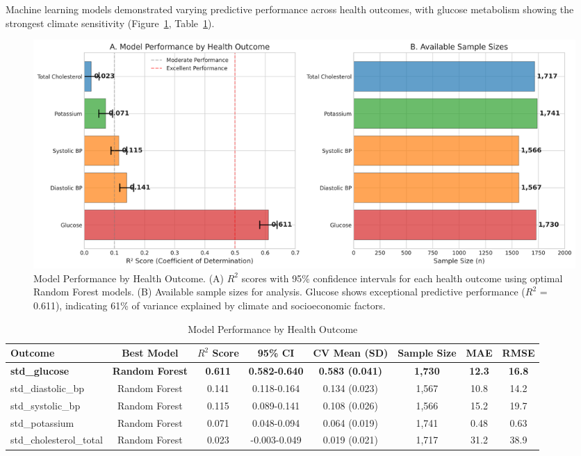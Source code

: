 \documentclass[11pt,a4paper]{article}
\begin{document}
Machine learning models demonstrated varying predictive performance across health outcomes, with glucose metabolism showing the strongest climate sensitivity (Figure~\ref{fig:model_performance}, Table~\ref{tab:model_performance}).

\begin{figure}[H]
\centering
\includegraphics[width=\textwidth]{Figure1_ModelPerformance.png}
\caption{Model Performance by Health Outcome. (A) $R^2$ scores with 95\% confidence intervals for each health outcome using optimal Random Forest models. (B) Available sample sizes for analysis. Glucose shows exceptional predictive performance ($R^2$ = 0.611), indicating 61\% of variance explained by climate and socioeconomic factors.}
\label{fig:model_performance}
\end{figure}

\begin{table}[H]
\centering
\caption{Model Performance by Health Outcome}
\label{tab:model_performance}
\footnotesize
\begin{tabular}{lccccccc}
\toprule
\textbf{Outcome} & \textbf{Best Model} & \textbf{$R^2$ Score} & \textbf{95\% CI} & \textbf{CV Mean (SD)} & \textbf{Sample Size} & \textbf{MAE} & \textbf{RMSE} \\
\midrule
\textbf{std\_glucose} & \textbf{Random Forest} & \textbf{0.611} & \textbf{0.582-0.640} & \textbf{0.583 (0.041)} & \textbf{1,730} & \textbf{12.3} & \textbf{16.8} \\
std\_diastolic\_bp & Random Forest & 0.141 & 0.118-0.164 & 0.134 (0.023) & 1,567 & 10.8 & 14.2 \\
std\_systolic\_bp & Random Forest & 0.115 & 0.089-0.141 & 0.108 (0.026) & 1,566 & 15.2 & 19.7 \\
std\_potassium & Random Forest & 0.071 & 0.048-0.094 & 0.064 (0.019) & 1,741 & 0.48 & 0.63 \\
std\_cholesterol\_total & Random Forest & 0.023 & -0.003-0.049 & 0.019 (0.021) & 1,717 & 31.2 & 38.9 \\
\bottomrule
\end{tabular}
\end{table}
\end{document}
